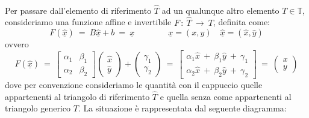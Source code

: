 \documentclass[12pt,a4paper]{report}
\theoremstyle{theorem}
\theoremstyle{theorem}
\theoremstyle{definition}
\begin{document}
\begin{center}
\end{center}

\hfill \\
Per passare dall'elemento di riferimento $\hat{T}$ ad un qualunque altro elemento $T \in \mathbb{T}$, consideriamo una funzione affine e invertibile $F \, : \ \hat{T} \  \rightarrow \ T$, definita come:
\[ F(\hat{\underline{x}}) \ = \ B \hat{\underline{x}} + b \ = \ \underline{x} \qquad \qquad \underline{x} = (x,y) \quad \hat{\underline{x}} = (\hat{x},\hat{y})\]
ovvero
\[
F(\hat{\underline{x}}) \ = \ \left[ \begin{array}{ccc}
\alpha_{1} & \beta_{1} \\
\alpha_{2} & \beta_{2} \end{array} \right] \left( \begin{array}{ccc}
\hat{x} \\
\hat{y} \end{array} \right) +  \left( \begin{array}{ccc}
\gamma_{1} \\
\gamma_{2} \end{array} \right)  \ = \ \left[ \begin{array}{ccc}
\alpha_{1} \hat{x} \ + \ \beta_{1} \hat{y} \ + \ \gamma_{1} \\
\alpha_{2} \hat{x} \ + \ \beta_{2} \hat{y} \ + \ \gamma_{2} \end{array} \right] \ = \ \left( \begin{array}{ccc}
x \\
y \end{array} \right) 
\]
dove per convenzione consideriamo le quantità con il cappuccio quelle appartenenti al triangolo di riferimento $\hat{T}$ e quella senza come appartenenti al triangolo generico $T$. La situazione è rappresentata dal seguente diagramma:
\end{document}
